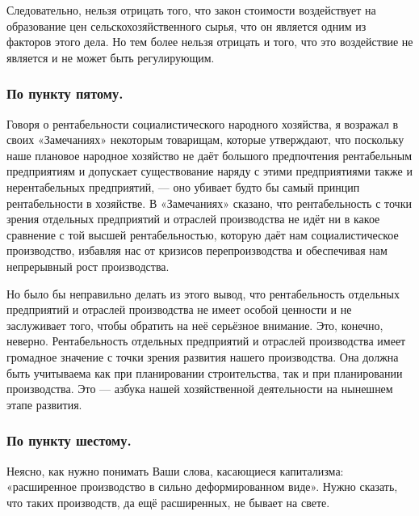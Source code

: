 \documentclass[12pt, a4paper, openany]{book}
\begin{document}
Следовательно, нельзя отрицать того, что закон стоимости воздействует на образование цен сельскохозяйственного сырья, что он является одним из факторов этого дела. Но тем более нельзя отрицать и того, что это воздействие не является и не может быть регулирующим.



\subsubsection*{По пункту пятому.}





Говоря о рентабельности социалистического народного хозяйства, я возражал в своих «Замечаниях» некоторым товарищам, которые утверждают, что поскольку наше плановое народное хозяйство не даёт большого предпочтения рентабельным предприятиям и допускает существование наряду с этими предприятиями также и нерентабельных предприятий, — оно убивает будто бы самый принцип рентабельности в хозяйстве. В «Замечаниях» сказано, что рентабельность с точки зрения отдельных предприятий и отраслей производства не идёт ни в какое сравнение с той высшей рентабельностью, которую даёт нам социалистическое производство, избавляя нас от кризисов перепроизводства и обеспечивая нам непрерывный рост производства.



Но было бы неправильно делать из этого вывод, что рентабельность отдельных предприятий и отраслей производства не имеет особой ценности и не заслуживает того, чтобы обратить на неё серьёзное внимание. Это, конечно, неверно. Рентабельность отдельных предприятий и отраслей производства имеет громадное значение с точки зрения развития нашего производства. Она должна быть учитываема как при планировании строительства, так и при планировании производства. Это — азбука нашей хозяйственной деятельности на нынешнем этапе развития.



\subsubsection*{По пункту шестому.}





Неясно, как нужно понимать Ваши слова, касающиеся капитализма: «расширенное производство в сильно деформированном виде». Нужно сказать, что таких производств, да ещё расширенных, не бывает на свете.
\end{document}
